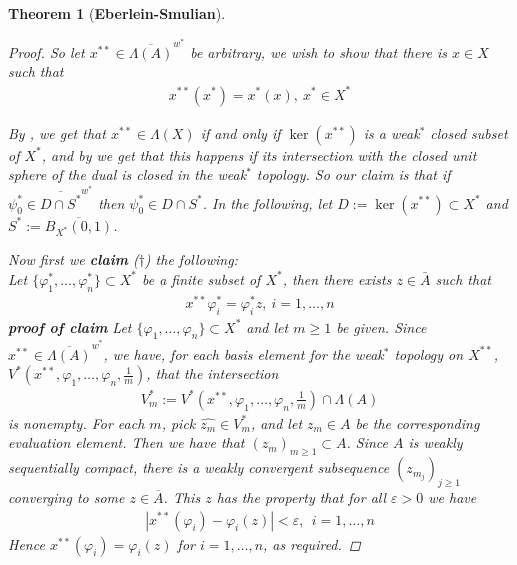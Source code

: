 \documentclass[10pt,twoside,openany,final]{memoir}
\theoremstyle{break}
\newtheorem{theorem}[section]{Theorem}
\theoremstyle{Break}
\newcommand{\N}{\mathbb{N}}
\begin{document}
\begin{theorem}[\bfseries{Eberlein-Smulian}]
\begin{proof}
So let $x^{**} \in \overline{\Lambda(A)}^{w^*}$ be arbitrary, we wish to show that there is $x \in X$ such that 
    \begin{align*}
    x^{**}(x^*)=x^*(x), \ x^* \in X^*
    \end{align*}

\noindent By , we get that $x^{**} \in \Lambda(X)$ if and only if $\ker(x^{**})$ is a weak$^*$ closed subset of $X^*$, and by  we get that this happens if its intersection with the closed unit sphere of the dual is closed in the weak$^*$ topology. So our claim is that if $\psi_{0}^* \in \overline{D \cap S^*}^{w^*} $ then $\psi_{0}^* \in D \cap S^*$.
In the following, let $D:=\ker(x^{**}) \subset X^*$ and $S^*:=\overline{B_{X^*}(0,1)}$.

Now first we \textbf{claim} ($\dagger$) the following:\\
Let $\{\varphi_{1}^*,\dots,\varphi_{n}^* \} \subset X^*$ be a finite subset of $X^*$, then there exists $z \in \bar{A}$ such that 
\begin{align*}
x^{**} \varphi_{i}^*=\varphi_{i}^* z, \ i=1,\dots,n
\end{align*}
\textbf{proof of claim}
Let $\{ \varphi_{1},\dots,\varphi_{n}\} \subset X^*$ and let $m\geq 1$ be given. Since $x^{**} \in \overline{\Lambda(A)}^{w^*}$, we have, for each basis element for the weak$^*$ topology on $X^{**}$, $V^*\left(x^{**},\varphi_{1},\dots,\varphi_{n},\frac1m\right)$, that the intersection
\begin{align*}
V_{m}^*:=V^*\left(x^{**},\varphi_{1},\dots,\varphi_{n},\frac1m\right) \cap \Lambda(A)
\end{align*}
is nonempty. For each $m$, pick $\widehat{z_{m}} \in V_{m}^*$, and let $z_{m} \in A$ be the corresponding evaluation element. Then we have that $(z_{m})_{m\geq 1} \subset A$. Since $A$ is weakly sequentially compact, there is a weakly convergent subsequence $(z_{m_{j}})_{j\geq 1}$ converging to some $z \in \overline{A}$. This $z$ has the property that for all $\varepsilon>0$ we have
\begin{align*}
|x^{**}(\varphi_{i})-\varphi_{i}(z)|< \varepsilon, \ \ i=1,\dots,n
\end{align*}
Hence $x^{**}(\varphi_{i})=\varphi_{i}(z)$ for $i=1,\dots,n$, as required.




\end{proof}
\end{theorem}
\end{document}
